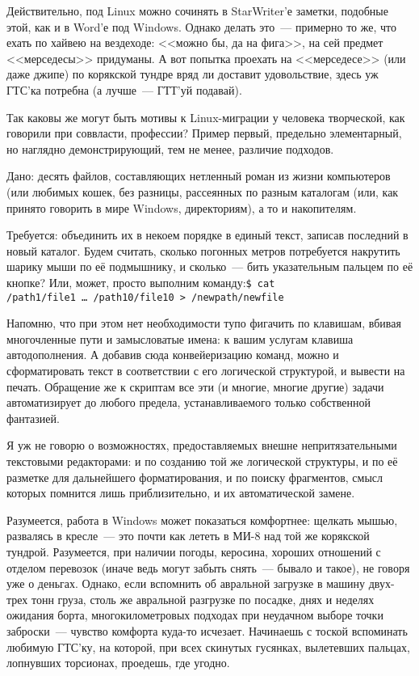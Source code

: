 Действительно, под Linux можно сочинять в StarWriter'е заметки, подобные этой, как и в Word'е под Windows. Однако делать это~--- примерно то же, что ехать по хайвею на вездеходе: <<можно бы, да на фига>>, на сей предмет <<мерседесы>> придуманы. А вот попытка проехать на <<мерседесе>> (или даже джипе) по корякской тундре вряд ли доставит удовольствие, здесь уж ГТС'ка потребна (а лучше~--- ГТТ'уй подавай). 

Так каковы же могут быть мотивы к Linux-миграции у человека творческой, как говорили при соввласти, профессии? Пример первый, предельно элементарный, но наглядно демонстрирующий, тем не менее, различие подходов. 

Дано: десять файлов, составляющих нетленный роман из жизни компьютеров (или любимых кошек, без разницы, рассеянных по разным каталогам (или, как принято говорить в мире Windows, директориям), а то и накопителям. 

Требуется: объединить их в некоем порядке в единый текст, записав последний в новый каталог. Будем считать, сколько погонных метров потребуется накрутить шарику мыши по её подмышнику, и сколько~--- бить указательным пальцем по её кнопке? Или, может, просто выполним команду:\medskip\texttt{\$ cat /path1/file1~\dots~/path10/file10 > /newpath/newfile}\medskip

Напомню, что при этом нет необходимости тупо фигачить по клавишам, вбивая многочленные пути и замысловатые имена: к вашим услугам клавиша автодополнения. А добавив сюда конвейеризацию команд, можно и сформатировать текст в соответствии с его логической структурой, и вывести на печать. Обращение же к скриптам все эти (и многие, многие другие) задачи автоматизирует до любого предела, устанавливаемого только собственной фантазией. 

Я уж не говорю о возможностях, предоставляемых внешне непритязательными текстовыми редакторами: и по созданию той же логической структуры, и по её разметке для дальнейшего форматирования, и по поиску фрагментов, смысл которых помнится лишь приблизительно, и их автоматической замене. 

Разумеется, работа в Windows может показаться комфортнее: щелкать мышью, развалясь в кресле~--- это почти как лететь в МИ-8 над той же корякской тундрой. Разумеется, при наличии погоды, керосина, хороших отношений с отделом перевозок (иначе ведь могут забыть снять~--- бывало и такое), не говоря уже о деньгах. Однако, если вспомнить об авральной загрузке в машину двух-трех тонн груза, столь же авральной разгрузке по посадке, днях и неделях ожидания борта, многокилометровых подходах при неудачном выборе точки заброски~--- чувство комфорта куда-то исчезает. Начинаешь с тоской вспоминать любимую ГТС'ку, на которой, при всех скинутых гусянках, вылетевших пальцах, лопнувших торсионах, проедешь, где угодно. 


